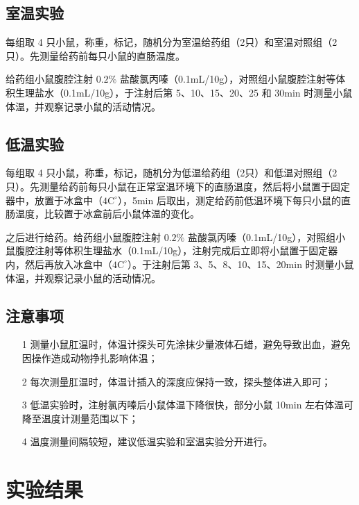 \documentclass[UTF8]{ctexart}
\begin{document}
\subsection{室温实验}

每组取 4 只小鼠，称重，标记，随机分为室温给药组（2只）和室温对照组（2只）。先测量给药前每只小鼠的直肠温度。

给药组小鼠腹腔注射 $0.2\%$ 盐酸氯丙嗪（0.1mL/10g），对照组小鼠腹腔注射等体积生理盐水（0.1mL/10g），于注射后第 5、10、15、20、25 和 30min 时测量小鼠体温，并观察记录小鼠的活动情况。

\subsection{低温实验}

每组取 4 只小鼠，称重，标记，随机分为低温给药组（2只）和低温对照组（2只）。先测量给药前每只小鼠在正常室温环境下的直肠温度，然后将小鼠置于固定器中，放置于冰盒中（$4\text{C}^\circ$），5min 后取出，测定给药前低温环境下每只小鼠的直肠温度，比较置于冰盒前后小鼠体温的变化。

之后进行给药。给药组小鼠腹腔注射 $0.2\%$ 盐酸氯丙嗪（0.1mL/10g），对照组小鼠腹腔注射等体积生理盐水（0.1mL/10g），注射完成后立即将小鼠置于固定器内，然后再放入冰盒中（$4\text{C}^\circ$）。于注射后第 3、5、8、10、15、20min 时测量小鼠体温，并观察记录小鼠的活动情况。

\subsection{注意事项}

\begin{itemize}
    \item [1] 测量小鼠肛温时，体温计探头可先涂抹少量液体石蜡，避免导致出血，避免因操作造成动物挣扎影响体温；
    \item [2] 每次测量肛温时，体温计插入的深度应保持一致，探头整体进入即可；
    \item [3] 低温实验时，注射氯丙嗪后小鼠体温下降很快，部分小鼠 10min 左右体温可降至温度计测量范围以下；
    \item [4] 温度测量间隔较短，建议低温实验和室温实验分开进行。
\end{itemize}

\section{实验结果}
\end{document}
